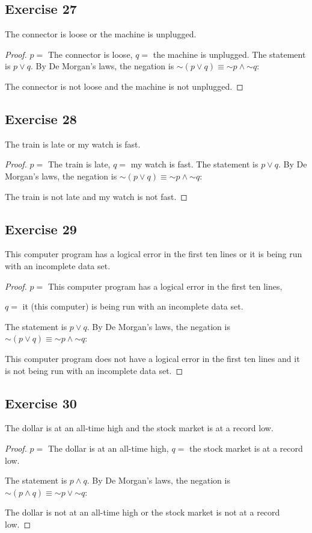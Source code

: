\documentclass[14pt]{extarticle}
\begin{document}
\subsection{Exercise 27} The connector is loose or the machine is unplugged.
\begin{proof} $p =$ The connector is loose, $q =$ the machine is unplugged.
The statement is $p \vee q$. By De Morgan's laws, the negation is $\sim(p \vee
q) \equiv {\sim p} \wedge {\sim q}$:

The connector is not loose and the machine is not unplugged. \end{proof}
\subsection{Exercise 28} The train is late or my watch is fast.
\begin{proof} $p =$ The train is late, $q =$ my watch is fast.
The statement is $p \vee q$. By De Morgan's laws, the negation is $\sim(p \vee
q) \equiv {\sim p} \wedge {\sim q}$:

The train is not late and my watch is not fast. \end{proof}
\subsection{Exercise 29} This computer program has a logical error in the first
ten lines or it is being run with an incomplete data set.

\begin{proof} $p =$ This computer program has a logical error in the first ten
lines,

$q =$ it (this computer) is being run with an incomplete data set.

The statement is $p \vee q$. By De Morgan's laws, the negation is $\sim(p \vee
q) \equiv {\sim p} \wedge {\sim q}$:

This computer program does not have a logical error in the first ten lines and
it is not being run with an incomplete data set. \end{proof}

\subsection{Exercise 30} The dollar is at an all-time high and the stock market
is at a record low.

\begin{proof} $p =$ The dollar is at an all-time high, $q =$ the stock market is
at a record low.

The statement is $p \wedge q$. By De Morgan's laws, the negation is $\sim(p
\wedge q) \equiv {\sim p} \vee {\sim q}$:

The dollar is not at an all-time high or the stock market is not at a record
low. \end{proof}
\end{document}
